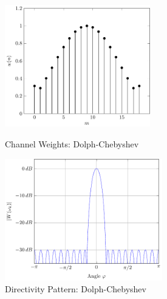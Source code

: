 \begin{figure}[h!]
    \begin{minipage}{0.49\textwidth}
    \centering
    \includegraphics[height=5.3cm]{images/3_Parametric_array/Dolph_Cheby_Window.pdf}
    \caption{Channel Weights: Dolph-Chebyshev}
    \label{3_subfig:directivity_no_steer_lambda4}
    \end{minipage}
    \begin{minipage}{0.49\textwidth}
    \centering
    \includegraphics[height=5.3cm]{images/3_Parametric_array/Cheby.pdf}
    \caption{Directivity Pattern: Dolph-Chebyshev}
     \label{3_subfig:directivity_no_steer_2lambda5}
    \end{minipage}
\end{figure}
\newpage





